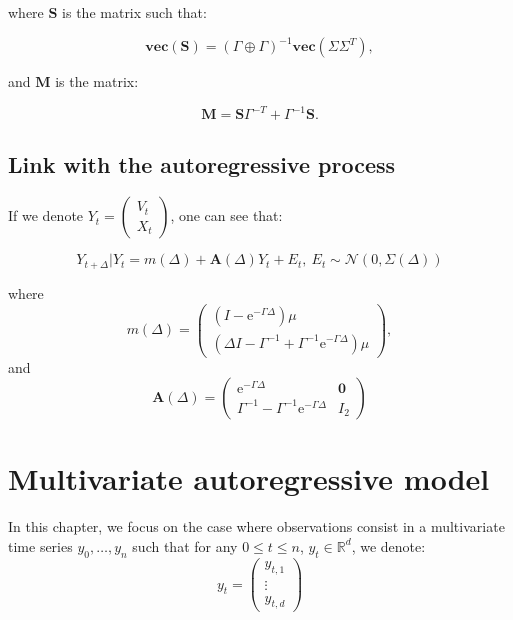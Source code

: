 \documentclass[]{book}
\newcommand{\e}{\text{e}}
\newcommand{\inv}{^{-1}}
\newcommand{\GpG}{\left( \Gamma \oplus \Gamma \right)}
\newcommand{\Vect}[1]{\textbf{vec}\left(#1 \right)}
\newcommand{\Sinf}{\mathbf{S}}
\newcommand{\M}{\mathbf{M}}
\begin{document}
where \(\Sinf\) is the matrix such that:

\begin{equation*}
\Vect{\Sinf} = \GpG\inv\Vect{\Sigma \Sigma^T}, 
\end{equation*}

and \(\M\) is the matrix:

\begin{equation*}
\M= \Sinf\Gamma^{-T} + \Gamma\inv\Sinf.
\end{equation*}

\section{Link with the autoregressive
process}\label{link-with-the-autoregressive-process}

If we denote \(Y_t = \begin{pmatrix} V_{t} \\ X_{t} \end{pmatrix}\), one
can see that:

\begin{equation*}
Y_{t + \Delta}\vert Y_t = m(\Delta) + \mathbf{A}(\Delta)  Y_t + E_t,~E_t \sim\mathcal{N}(0,\Sigma(\Delta))
\end{equation*}

where \[
m(\Delta) =
\begin{pmatrix}
(I - \e^{-\Gamma\Delta}) \mu\\
(\Delta I - \Gamma\inv + \Gamma\inv\e^{-\Gamma\Delta})\mu
\end{pmatrix},
\] and
\[\mathbf{A}\left(\Delta\right) = \begin{pmatrix}\e^{-\Gamma\Delta} & \mathbf{0} \\
\Gamma\inv - \Gamma\inv\e^{-\Gamma\Delta} &I_2\end{pmatrix}\]

\chapter{Multivariate autoregressive model}\label{simpleAR}

In this chapter, we focus on the case where observations consist in a
multivariate time series \(y_0, \dots, y_n\) such that for any
\(0\leq t \leq n\), \(y_t \in \mathbb{R}^d\), we denote: \[y_t = 
\begin{pmatrix}
y_{t,1}\\
\vdots\\
y_{t, d}
\end{pmatrix}\]
\end{document}
